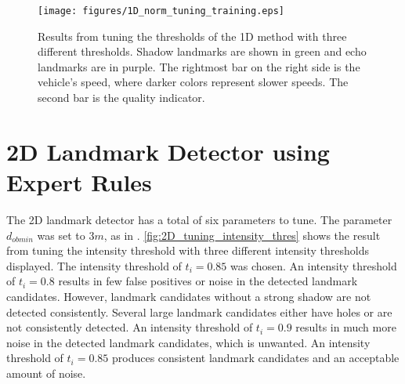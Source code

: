 \begin{figure}  %
  \centering
  \texttt{[image: figures/1D\_norm\_tuning\_training.eps]}
  \caption[Results of tuning threshold of the 1D method]{Results from tuning the thresholds of the 1D method with three different thresholds. Shadow landmarks are shown in green and echo landmarks are in purple. The rightmost bar on the right side is the vehicle's speed, where darker colors represent slower speeds. The second bar is the quality indicator.}
  \label{fig:1D_norm_tuning_training}
\end{figure}



\section{2D Landmark Detector using Expert Rules}

The 2D landmark detector has a total of six parameters to tune. The parameter $d_{ob min}$ was set to $3 m $, as in \cite{Leblond2019SonarProject}. \cref{fig:2D_tuning_intensity_thres} shows the result from tuning the intensity threshold with three different intensity thresholds displayed. The intensity threshold of $t_i = 0.85$ was chosen. An intensity threshold of $t_i = 0.8$ results in few false positives or noise in the detected landmark candidates. However, landmark candidates without a strong shadow are not detected consistently. Several large landmark candidates either have holes or are not consistently detected. An intensity threshold of $t_i = 0.9$ results in much more noise in the detected landmark candidates, which is unwanted. An intensity threshold of $t_i = 0.85$ produces consistent landmark candidates and an acceptable amount of noise. 

